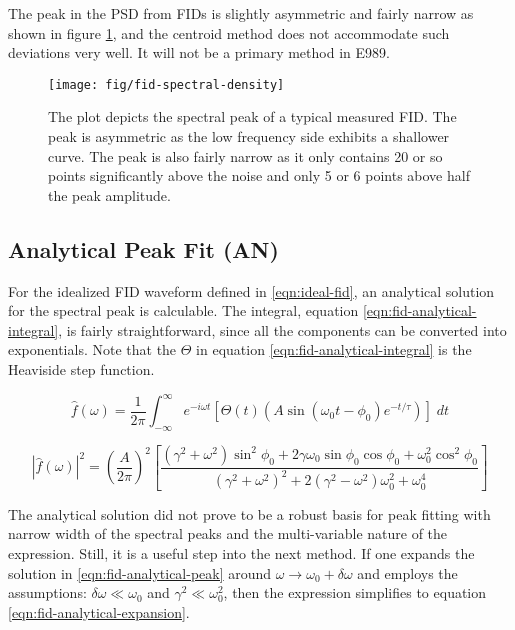 The peak in the PSD from FIDs is slightly asymmetric and fairly narrow as shown in figure \ref{fig:fid-spectral-density}, and the centroid method does not accommodate such deviations very well.  It will not be a primary method in E989.

\begin{figure}
\centering
\texttt{[image: fig/fid-spectral-density]}
\caption{
    The plot depicts the spectral peak of a typical measured FID.  The peak is asymmetric as the low frequency side exhibits a shallower curve.  The peak is also fairly narrow as it only contains 20 or so points significantly above the noise and only 5 or 6 points above half the peak amplitude.
    \label{fig:fid-spectral-density}
}
\end{figure}

\subsection{Analytical Peak Fit (AN)} \label{s-sec:fid-analytical}
For the idealized FID waveform defined in \ref{eqn:ideal-fid}, an analytical solution for the spectral peak is calculable.  The integral, equation \ref{eqn:fid-analytical-integral}, is fairly straightforward, since all the components can be converted into exponentials.  Note that the $\Theta$ in equation \ref{eqn:fid-analytical-integral} is the Heaviside step function.

\begin{equation}
\label{eqn:fid-analytical-integral}
\hat{f}(\omega) = \frac{1}{2\pi} \int_{-\infty}^{\infty} 
e^{-i \omega t} \left[ \Theta(t) \left(A \sin(\omega_0 t - \phi_0) e^{-t / \tau} \right) \right] \;dt
\end{equation}

\begin{equation}
\label{eqn:fid-analytical-peak}
\left| \hat{f}(\omega) \right|^2 = 
\left( \frac{A}{2\pi} \right)^2
\left[\frac{(\gamma^2 + \omega^2) \sin^2{\phi_0} 
+ 2 \gamma \omega_0 \sin{\phi_0} \cos{\phi_0} + \omega_0^2 \cos^2{\phi_0}}{(\gamma^2 + \omega^2)^2 + 2(\gamma^2 - \omega^2) \omega_0^2 + \omega_0^4}
\right]
\end{equation}

The analytical solution did not prove to be a robust basis for peak fitting with narrow width of the spectral peaks and the multi-variable nature of the expression.  Still, it is a useful step into the next method.  If one expands the solution in \ref{eqn:fid-analytical-peak} around $\omega \rightarrow \omega_0 + \delta \omega$ and employs the assumptions: $\delta \omega \ll \omega_0$ and $\gamma^2 \ll \omega_0^2$, then the expression simplifies to equation \ref{eqn:fid-analytical-expansion}.

